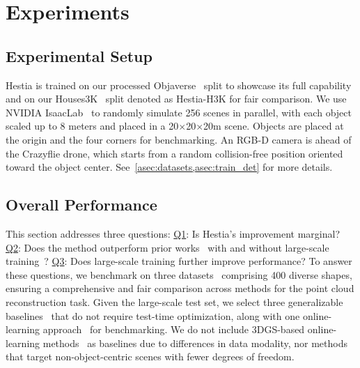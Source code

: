 \section{Experiments}
\label{sec:exp}

\subsection{Experimental Setup}

Hestia is trained on our processed Objaverse~\cite{deitke2024objaverse, Deitke_2023_CVPR} split to showcase its full capability and on our Houses3K~\cite{peralta2020next} split denoted as Hestia-H3K for fair comparison. 
We use NVIDIA IsaacLab~\cite{mittal2023orbit} to randomly simulate 256 scenes in parallel, with each object scaled up to 8 meters and placed in a 20$\times$20$\times$20m scene.  
Objects are placed at the origin and the four corners for benchmarking.
An RGB-D camera is ahead of the Crazyflie drone, which starts from a random collision-free position oriented toward the object center.
See~\cref{asec:datasets,asec:train_det} for more details.

\subsection{Overall Performance}

This section addresses three questions: \underline{Q1}: Is Hestia’s improvement marginal? \underline{Q2}: Does the method outperform prior works~\cite{jin2023neu, guedon2023macarons, peralta2020next, chen2024gennbv} with and without large-scale training~\cite{deitke2024objaverse, Deitke_2023_CVPR}? \underline{Q3}: Does large-scale training further improve performance? 
To answer these questions, we benchmark on three datasets~\cite{deitke2024objaverse, Deitke_2023_CVPR, wu2023omniobject3d, peralta2020next} comprising 400 diverse shapes, ensuring a comprehensive and fair comparison across methods for the point cloud reconstruction task.
Given the large-scale test set, we select three generalizable baselines~\cite{jin2023neu, chen2024gennbv, peralta2020next} that do not require test-time optimization, along with one online-learning approach~\cite{guedon2023macarons} for benchmarking.
We do not include 3DGS-based online-learning methods~\cite{wilson2025pop, li2025activesplat, khass2025active} as baselines due to differences in data modality, nor methods~\cite{li2025nextbestpath, chen2025gleam} that target non-object-centric scenes with fewer degrees of freedom.


